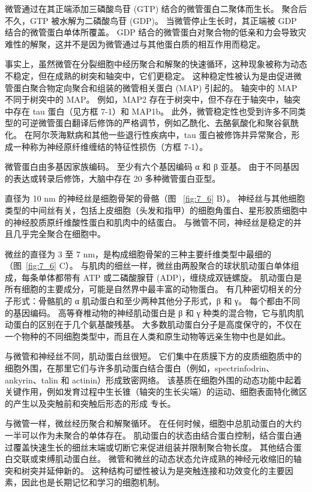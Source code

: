 微管通过在其正端添加三磷酸鸟苷 (GTP) 结合的微管蛋白二聚体而生长。
聚合后不久，GTP 被水解为二磷酸鸟苷 (GDP)。
当微管停止生长时，其正端被 GDP 结合的微管蛋白单体所覆盖。
GDP 结合的微管蛋白对聚合物的低亲和力会导致灾难性的解聚，这并不是因为微管通过与其他蛋白质的相互作用而稳定。


事实上，虽然微管在分裂细胞中经历聚合和解聚的快速循环，这种现象被称为动态不稳定，但在成熟的树突和轴突中，它们更稳定。
这种稳定性被认为是由促进微管蛋白聚合物定向聚合和组装的微管相关蛋白 (MAP) 引起的。
轴突中的 MAP 不同于树突中的 MAP。
例如，MAP2 存在于树突中，但不存在于轴突中，轴突中存在 tau 蛋白（见方框 7-1）和 MAP1b。
此外，微管稳定性也受到许多不同类型的可逆微管蛋白翻译后修饰的严格调节，例如乙酰化、去酪氨酸化和聚谷氨酰化。
在阿尔茨海默病和其他一些退行性疾病中，tau 蛋白被修饰并异常聚合，形成一种称为神经原纤维缠结的特征性损伤（方框 7-1）。


微管蛋白由多基因家族编码。 
至少有六个基因编码 α 和 β 亚基。 
由于不同基因的表达或转录后修饰，大脑中存在 20 多种微管蛋白亚型。


直径为 10 nm 的神经丝是细胞骨架的骨骼（图 ~\ref{fig:7_6} B）。
神经丝与其他细胞类型的中间丝有关，包括上皮细胞（头发和指甲）的细胞角蛋白、星形胶质细胞中的神经胶质原纤维酸性蛋白和肌肉中的结蛋白。
与微管不同，神经丝是稳定的并且几乎完全聚合在细胞中。


微丝的直径为 3 至 7 nm，是构成细胞骨架的三种主要纤维类型中最细的（图~\ref{fig:7_6} C）。 
与肌肉的细丝一样，微丝由两股聚合的球状肌动蛋白单体组成，每条单体都带有 ATP 或二磷酸腺苷 (ADP)，缠绕成双链螺旋。
肌动蛋白是所有细胞的主要成分，可能是自然界中最丰富的动物蛋白。
有几种密切相关的分子形式：骨骼肌的 α 肌动蛋白和至少两种其他分子形式，β 和 γ。
每个都由不同的基因编码。
高等脊椎动物的神经肌动蛋白是 β 和 γ 种类的混合物，它与肌肉肌动蛋白的区别在于几个氨基酸残基。 
大多数肌动蛋白分子是高度保守的，不仅在一个物种的不同细胞类型中，而且在人类和原生动物等远亲生物中也是如此。


与微管和神经丝不同，肌动蛋白丝很短。
它们集中在质膜下方的皮质细胞质中的细胞外围，在那里它们与许多肌动蛋白结合蛋白（例如，spectrinfodrin、ankyrin、talin 和 actinin）形成致密网络。 
该基质在细胞外围的动态功能中起着关键作用，例如发育过程中生长锥（轴突的生长尖端）的运动、细胞表面特化微区的产生以及突触前和突触后形态的形成 专长。


与微管一样，微丝经历聚合和解聚循环。
在任何时候，细胞中总肌动蛋白的大约一半可以作为未聚合的单体存在。
肌动蛋白的状态由结合蛋白控制，结合蛋白通过覆盖快速生长的细丝末端或切断它来促进组装并限制聚合物长度。 
其他结合蛋白交联或束缚肌动蛋白丝。
微管和微丝的动态状态允许成熟的神经元收缩旧的轴突和树突并延伸新的。
这种结构可塑性被认为是突触连接和功效变化的主要因素，因此也是长期记忆和学习的细胞机制。



